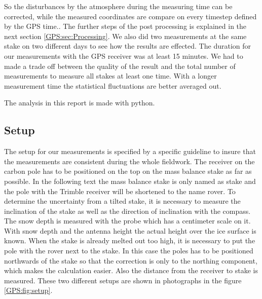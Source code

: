 So the disturbances by the atmosphere during the measuring time can be corrected, while the measured coordinates are compare on every timestep defined by the GPS time.. 
The further steps of the post processing is explained in the next section \ref{GPS:sec:Processing}.
We also did two measurements at the same stake on two different days to see how the results are effected.
The duration for our measurements with the GPS receiver was at least 15 minutes. 
We had to made a trade off between the quality of the result and the total number of
measurements to measure all stakes at least one time. 
With a longer measurement time the statistical fluctuations are better averaged out.
\medskip

The analysis in this report is made with python.

\subsection{Setup} \label{GPS:subsec:setup}

The setup for our measurements is specified by a specific guideline to insure that the measurements are consistent during the whole fieldwork.
The receiver on the carbon pole has to be positioned on the top on the mass balance stake as far as possible.
In the following text the mass balance stake is only named as stake and the pole with the Trimble receiver will be shortened to the name rover. 
To determine the uncertainty from a tilted stake, it is necessary to measure the inclination of the stake as well as the direction of inclination with the compass.
The snow depth is measured with the probe which has a centimeter scale on it.
With snow depth and the antenna height the actual height over the ice surface is known. 
When the stake is already melted out too high, it is necessary to put the pole with the rover next to the stake. 
In this case the poles has to be positioned northwards of the stake so that the correction is only to the northing component, which makes the calculation easier. 
Also the distance from the receiver to stake is measured.
These two different setups are shown in photographs in the figure \ref{GPS:fig:setup}.


